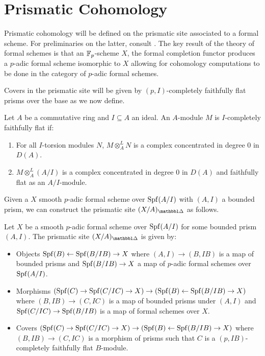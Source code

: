 \section{Prismatic Cohomology}\label{sec: prismatic cohomology}
Prismatic cohomology will be defined on the prismatic site associated to a formal scheme. For preliminaries on the latter, consult \cite[\href{https://stacks.math.columbia.edu/tag/0AHY}{Tag 0AHY}]{stacks-project}. The key result of the theory of formal schemes is that an $\mathbb{F}_{p}$-scheme $X$, the formal completion functor produces a $p$-adic formal scheme isomorphic to $X$ allowing for cohomology computations to be done in the category of $p$-adic formal schemes.

Covers in the prismatic site will be given by $(p,I)$-completely faithfully flat prisms over the base as we now define. 
\begin{definition}\label{def: completely faithfully flat morphism}
    Let $A$ be a commutative ring and $I\subseteq A$ an ideal. An $A$-module $M$ is $I$-completely faithfully flat if:
    \begin{enumerate}[label=(\roman*)]
        \item For all $I$-torsion modules $N$, $M\otimes^{L}_{A}N$ is a complex concentrated in degree 0 in $D(A)$. 
        \item $M\otimes^{L}_{A}(A/I)$ is a complex concentrated in degree 0 in $D(A)$ and faithfully flat as an $A/I$-module. 
    \end{enumerate}
\end{definition}
Given a $X$ smooth $p$-adic formal scheme over $\mathrm{Spf}(A/I)$ with $(A,I)$ a bounded prism, we can construct the prismatic site $(X/A)_{\prism}$ as follows. 
\begin{definition}\label{def: prismatic site}
    Let $X$ be a smooth $p$-adic formal scheme over $\mathrm{Spf}(A/I)$ for some bounded prism $(A,I)$. The prismatic site $(X/A)_{\prism}$ is given by:
    \begin{itemize}
        \item Objects $\mathrm{Spf}(B)\leftarrow \mathrm{Spf}(B/IB)\to X$ where $(A,I)\to(B, IB)$ is a map of bounded prisms and $\mathrm{Spf}(B/IB)\to X$ a map of $p$-adic formal schemes over $\mathrm{Spf}(A/I)$. 
        \item Morphisms $(\mathrm{Spf}(C)\rightarrow\mathrm{Spf}(C/IC)\to X)\to(\mathrm{Spf}(B)\leftarrow\mathrm{Spf}(B/IB)\to X)$ where $(B,IB)\to (C,IC)$ is a map of bounded prisms under $(A, I)$ and  $\mathrm{Spf}(C/IC)\to\mathrm{Spf}(B/IB)$ is a map of formal schemes over $X$. 
        \item Covers $(\mathrm{Spf}(C)\rightarrow\mathrm{Spf}(C/IC)\to X)\to(\mathrm{Spf}(B)\leftarrow\mathrm{Spf}(B/IB)\to X)$ where $(B,IB)\to (C,IC)$ is a morphism of prisms such that $C$ is a $(p,IB)$-completely faithfully flat $B$-module. 
    \end{itemize}
\end{definition}
